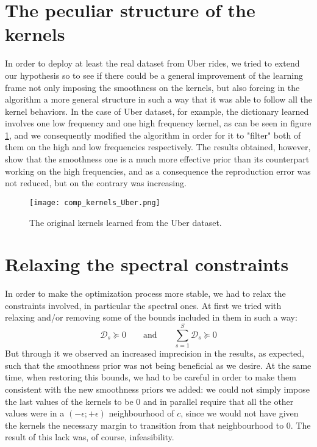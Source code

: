 \section{The peculiar structure of the kernels}
 In order to deploy at least the real dataset from Uber rides, we tried to extend our hypothesis so to see if there could be a general improvement of the learning frame not only imposing the smoothness on the kernels, but also forcing in the algorithm a more general structure in such a way that it was able to follow all the kernel behaviors. In the case of Uber dataset, for example, the dictionary learned involves one low frequency and one high frequency kernel, as can be seen in figure \ref{fig:uber}, and we consequently modified the algorithm in order for it to "filter" both of them on the high and low frequencies respectively. The results obtained, however, show that the smoothness one is a much more effective prior than its counterpart working on the high frequencies, and as a consequence the reproduction error was not reduced, but on the contrary was increasing.

 \begin{figure}[tb]
   \centering
   \texttt{[image: comp\_kernels\_Uber.png]}
   \caption{The original kernels learned from the Uber dataset.}
   \label{fig:uber}
 \end{figure}

 \section{Relaxing the spectral constraints}
In order to make the optimization process more stable, we had to relax the constraints involved, in particular the spectral ones. At first we tried with relaxing and/or removing some of the bounds included in them in such a way: 
\begin{equation}
\mathcal{D}_s \succeq 0 \qquad \text{and} \qquad \sum_{s=1}^S\mathcal{D}_s \succeq 0
\end{equation}
But through it we observed an increased imprecision in the results, as expected, such that the smoothness prior was not being beneficial as we desire. At the same time, when restoring this bounds, we had to be careful in order to make them consistent with the new smoothness priors we added: we could not simply impose the last values of the kernels to be $0$ and in parallel require that all the other values were in a $(-\epsilon;+\epsilon)$ neighbourhood of $c$, since we would not have given the kernels the necessary margin to transition from that neighbourhood to $0$. The result of this lack was, of course, infeasibility.
